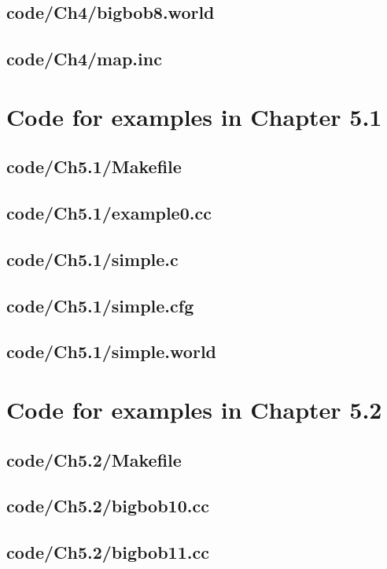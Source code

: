 \documentclass[a4paper]{report}
\begin{document}
{\section{code/Ch4/bigbob8.world}

\section{code/Ch4/map.inc}

\chapter{Code for examples in Chapter 5.1}
\section{code/Ch5.1/Makefile}

\section{code/Ch5.1/example0.cc}

\section{code/Ch5.1/simple.c}

\section{code/Ch5.1/simple.cfg}

\section{code/Ch5.1/simple.world}

\chapter{Code for examples in Chapter 5.2}
\section{code/Ch5.2/Makefile}

\section{code/Ch5.2/bigbob10.cc}

\section{code/Ch5.2/bigbob11.cc}

}
\end{document}
